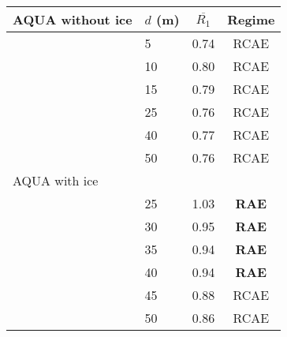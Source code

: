 \documentclass{ametsocV5}
\begin{document}
\begin{table}[t]
  \caption{}
    \label{tab:aqua-r1}
\begin{center}
  \renewcommand{\arraystretch}{1.0}
  \begin{tabular}{ l l c c }
      AQUA without ice &   $d$ (m) &  $\overline{R_1}$ & Regime        \\
      \hline
      & 5        & 0.74 & RCAE       \\
      & 10       & 0.80 & RCAE       \\
      & 15       & 0.79 & RCAE       \\
      & 25       & 0.76 & RCAE       \\
      & 40       & 0.77 & RCAE       \\
      & 50       & 0.76 & RCAE       \\ \newline

      AQUA with ice \\ %
      \hline
      & 25       & 1.03 & \textbf{ RAE}\\
      & 30       & 0.95 & \textbf{ RAE} \\
      & 35       & 0.94 & \textbf{ RAE} \\
      & 40       & 0.94 & \textbf{ RAE} \\
      & 45       & 0.88 & RCAE \\
      & 50       & 0.86 & RCAE \\

  \end{tabular}
\end{center}
\end{table}

\end{document}
